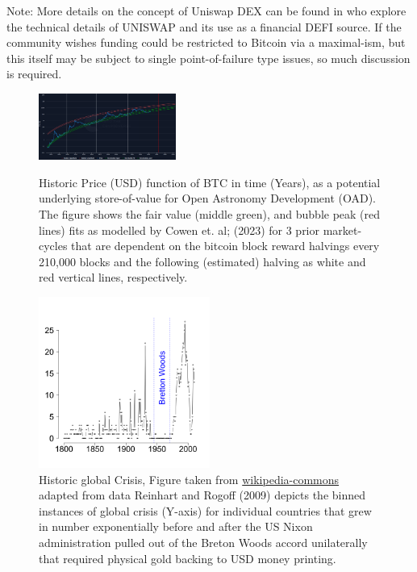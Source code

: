 \documentclass[final,5p,times,twocolumn,authoryear]{elsarticle}
\begin{document}
Note:  More details on the concept of Uniswap DEX can be found in \cite{uniswap2019_angeris} who explore the technical details of UNISWAP and its use as a financial DEFI source. If the community wishes funding could be restricted to Bitcoin via a maximal-ism, but this itself may be subject to single point-of-failure type issues, so much discussion is required.  

 \begin{figure}[ht!]
  \centering
  \caption{Historic Price (USD) function of BTC in time (Years), as a potential underlying store-of-value for Open Astronomy Development (OAD). The figure shows the fair value (middle green), and bubble peak (red lines) fits as modelled by Cowen et. al; (2023) for 3 prior market-cycles that are dependent on the bitcoin block reward halvings every 210,000 blocks and the following (estimated) halving as white and red vertical lines, respectively.}
  \includegraphics[width=0.4\textwidth]{figs/cowen3.png}
  \label{fig:cowen}
  \end{figure}

\begin{figure}[h!]
    \centering
  \caption{Historic global Crisis, Figure taken from \href{https://en.wikipedia.org/wiki/Global_recession}{wikipedia-commons} adapted from data Reinhart and Rogoff (2009) depicts the binned instances of global crisis (Y-axis) for individual countries that grew in number exponentially before and after the US Nixon administration pulled out of the Breton Woods accord unilaterally that required physical gold backing to USD money printing.}
  \label{fig:crisis}
  \includegraphics[width=0.5\textwidth]{figs/330px-BankingCrises.svg.png}
\end{figure}
\end{document}
